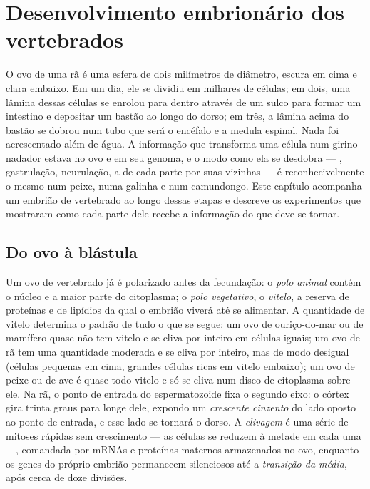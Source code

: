 \chapter{Desenvolvimento embrionário dos vertebrados}\label{ch:b2:vertebrate-development}

O ovo de uma rã é uma esfera de dois milímetros de diâmetro, escura em
cima e clara embaixo. Em um dia, ele se dividiu em milhares de
células; em dois, uma lâmina dessas células se enrolou para dentro
através de um sulco para formar um intestino e depositar um bastão ao
longo do dorso; em três, a lâmina acima do bastão se dobrou num tubo
que será o encéfalo e a medula espinal. Nada foi acrescentado além de
água. A informação que transforma uma célula num girino nadador estava
no ovo e em seu genoma, e o modo como ela se desdobra --- ,
gastrulação, neurulação, a  de cada parte por suas vizinhas ---
é reconhecivelmente o mesmo num peixe, numa galinha e num camundongo.
Este capítulo acompanha um embrião de vertebrado ao longo dessas
etapas e descreve os experimentos que mostraram como cada parte dele
recebe a informação do que deve se tornar.

\section{Do ovo à blástula}

\begin{definition}\label{def:b2:vertebrate-development:egg}
Um ovo de vertebrado já é polarizado antes da fecundação: o
\emph{polo animal} contém o núcleo e a maior parte do citoplasma; o
\emph{polo vegetativo}, o \emph{vitelo}, a reserva de proteínas e de
lipídios da qual o embrião viverá até se alimentar. A quantidade de
vitelo determina o padrão de tudo o que se segue: um ovo de ouriço-do-mar
ou de mamífero quase não tem vitelo e se cliva por inteiro em células
iguais; um ovo de rã tem uma quantidade moderada e se cliva por
inteiro, mas de modo desigual (células pequenas em cima, grandes
células ricas em vitelo embaixo); um ovo de peixe ou de ave é quase
todo vitelo e só se cliva num disco de citoplasma sobre ele. Na rã, o
ponto de entrada do espermatozoide fixa o segundo eixo: o córtex gira
trinta graus para longe dele, expondo um \emph{crescente cinzento} do
lado oposto ao ponto de entrada, e esse lado se tornará o dorso. A
\emph{clivagem} é uma série de mitoses rápidas sem crescimento --- as
células se reduzem à metade em cada uma ---, comandada por mRNAs e
proteínas maternos armazenados no ovo, enquanto os genes do próprio
embrião permanecem silenciosos até a \emph{transição da 
média}, após cerca de doze divisões.
\end{definition}

